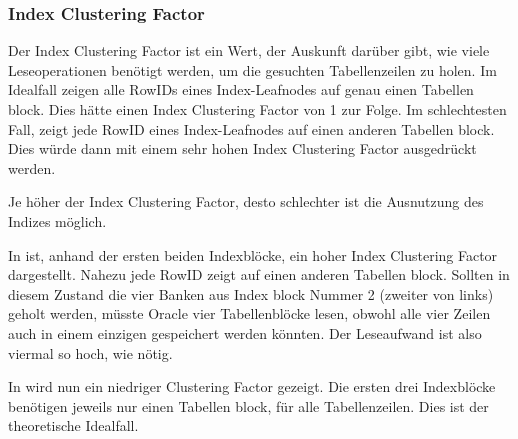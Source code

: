         \subsubsection{Index Clustering Factor}
          Der Index Clustering Factor ist ein Wert, der Auskunft darüber gibt, wie viele Leseoperationen benötigt werden, um die gesuchten Tabellenzeilen zu holen. Im Idealfall zeigen alle RowIDs eines Index-Leafnodes auf genau einen Tabellen block. Dies hätte einen Index Clustering Factor von 1 zur Folge. Im schlechtesten Fall, zeigt jede RowID eines Index-Leafnodes auf einen anderen Tabellen block. Dies würde dann mit einem sehr hohen Index Clustering Factor ausgedrückt werden.
          \begin{merke}
            Je höher der Index Clustering Factor, desto schlechter ist die Ausnutzung des Indizes möglich.
          \end{merke}
					In  ist, anhand der ersten beiden Indexblöcke, ein hoher Index Clustering Factor dargestellt. Nahezu jede RowID zeigt auf einen anderen Tabellen block. Sollten in diesem Zustand die vier Banken aus Index block Nummer 2 (zweiter von links) geholt werden, müsste Oracle vier Tabellenblöcke lesen, obwohl alle vier Zeilen auch in einem einzigen gespeichert werden könnten. Der Leseaufwand ist also viermal so hoch, wie nötig.
\clearpage

          In  wird nun ein niedriger Clustering Factor gezeigt. Die ersten drei Indexblöcke benötigen jeweils nur einen Tabellen block, für alle Tabellenzeilen. Dies ist der theoretische Idealfall.


